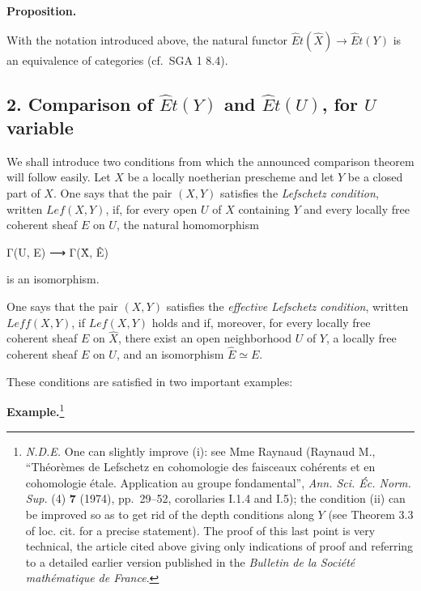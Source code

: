 \documentclass[
]{article}
\newenvironment{Shaded}{}{}
\newcommand{\NormalTok}[1]{#1}
\begin{document}
\textbf{Proposition.}

With the notation introduced above, the natural functor
\(\hat{E}t(\hat{X}) \to \hat{E}t(Y)\) is an equivalence of categories
(cf.~SGA 1 8.4).

\subsection{\texorpdfstring{2. Comparison of \(\hat{E}t(Y)\) and
\(\hat{E}t(U)\), for \(U\)
variable}{2. Comparison of \textbackslash hat\{E\}t(Y) and \textbackslash hat\{E\}t(U), for U variable}}\label{comparison-of-hatety-and-hatetu-for-u-variable}

We shall introduce two conditions from which the announced comparison
theorem will follow easily. Let \(X\) be a locally noetherian prescheme
and let \(Y\) be a closed part of \(X\). One says that the pair
\((X, Y)\) satisfies the \emph{Lefschetz condition}, written
\(Lef(X, Y)\), if, for every open \(U\) of \(X\) containing \(Y\) and
every locally free coherent sheaf \(E\) on \(U\), the natural
homomorphism

\begin{Shaded}
\begin{Highlighting}[]
\NormalTok{Γ(U, E) ⟶ Γ(X̂, Ê)}
\end{Highlighting}
\end{Shaded}

is an isomorphism.

One says that the pair \((X, Y)\) satisfies the \emph{effective
Lefschetz condition}, written \(Leff(X, Y)\), if \(Lef(X, Y)\) holds and
if, moreover, for every locally free coherent sheaf \(E\) on
\(\hat{X}\), there exist an open neighborhood \(U\) of \(Y\), a locally
free coherent sheaf \(E\) on \(U\), and an isomorphism
\(\hat{E} \simeq E\).

These conditions are satisfied in two important examples:

\textbf{Example.}\footnote{\emph{N.D.E.} One can slightly improve (i):
  see Mme Raynaud (Raynaud M., ``Théorèmes de Lefschetz en cohomologie
  des faisceaux cohérents et en cohomologie étale. Application au groupe
  fondamental'', \emph{Ann. Sci. Éc. Norm. Sup.} (4) \textbf{7} (1974),
  pp.~29--52, corollaries I.1.4 and I.5); the condition (ii) can be
  improved so as to get rid of the depth conditions along \(Y\) (see
  Theorem 3.3 of loc. cit. for a precise statement). The proof of this
  last point is very technical, the article cited above giving only
  indications of proof and referring to a detailed earlier version
  published in the \emph{Bulletin de la Société mathématique de France}.}
\end{document}
